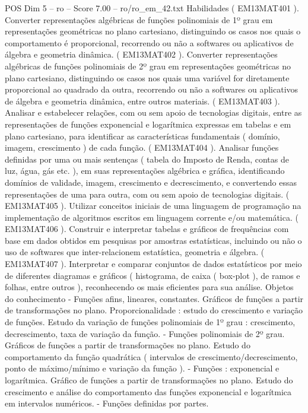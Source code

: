 \begin{textsample}{POS Dim 5 – ro – Score 7.00 – ro/ro\_em\_42.txt}
Habilidades ( EM13MAT401 ).
Converter representações algébricas de funções polinomiais de 1º grau em representações geométricas no plano cartesiano, distinguindo os casos nos quais o comportamento é proporcional, recorrendo ou não a softwares ou aplicativos de álgebra e geometria dinâmica. ( EM13MAT402 ).
Converter representações algébricas de funções polinomiais de 2º grau em representações geométricas no plano cartesiano, distinguindo os casos nos quais uma variável for diretamente proporcional ao quadrado da outra, recorrendo ou não a softwares ou aplicativos de álgebra e geometria dinâmica, entre outros materiais. ( EM13MAT403 ).
Analisar e estabelecer relações, com ou sem apoio de tecnologias digitais, entre as representações de funções exponencial e logarítmica expressas em tabelas e em plano cartesiano, para identificar as características fundamentais ( domínio, imagem, crescimento ) de cada função. ( EM13MAT404 ).
Analisar funções definidas por uma ou mais sentenças ( tabela do Imposto de Renda, contas de luz, água, gás etc. ), em suas representações algébrica e gráfica, identificando domínios de validade, imagem, crescimento e decrescimento, e convertendo essas representações de uma para outra, com ou sem apoio de tecnologias digitais. ( EM13MAT405 ).
Utilizar conceitos iniciais de uma linguagem de programação na implementação de algoritmos escritos em linguagem corrente e/ou matemática. ( EM13MAT406 ).
Construir e interpretar tabelas e gráficos de frequências com base em dados obtidos em pesquisas por amostras estatísticas, incluindo ou não o uso de softwares que inter-relacionem estatística, geometria e álgebra. ( EM13MAT407 ).
Interpretar e comparar conjuntos de dados estatísticos por meio de diferentes diagramas e gráficos ( histograma, de caixa ( box-plot ), de ramos e folhas, entre outros ), reconhecendo os mais eficientes para sua análise.
Objetos do conhecimento - Funções afins, lineares, constantes.
Gráficos de funções a partir de transformações no plano.
Proporcionalidade : estudo do crescimento e variação de funções.
Estudo da variação de funções polinomiais de 1º grau : crescimento, decrescimento, taxa de variação da função. - Funções polinomiais de 2º grau.
Gráficos de funções a partir de transformações no plano.
Estudo do comportamento da função quadrática ( intervalos de crescimento/decrescimento, ponto de máximo/mínimo e variação da função ). - Funções : exponencial e logarítmica.
Gráfico de funções a partir de transformações no plano.
Estudo do crescimento e análise do comportamento das funções exponencial e logarítmica em intervalos numéricos. - Funções definidas por partes.

\end{textsample}
